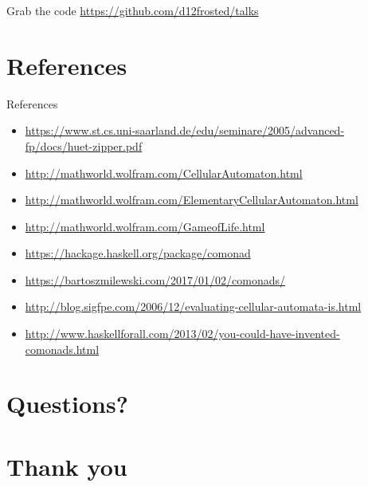 \documentclass[presentation,aspectratio=169,smaller]{beamer}
\begin{document}
\begin{frame}[label={sec:org5e860fe}]{Grab the code}
\url{https://github.com/d12frosted/talks}
\end{frame}

\section*{References}
\label{sec:orged78944}
\begin{frame}[label={sec:orgca59229}]{References}
\begin{itemize}
\item \url{https://www.st.cs.uni-saarland.de/edu/seminare/2005/advanced-fp/docs/huet-zipper.pdf}
\item \url{http://mathworld.wolfram.com/CellularAutomaton.html}
\item \url{http://mathworld.wolfram.com/ElementaryCellularAutomaton.html}
\item \url{http://mathworld.wolfram.com/GameofLife.html}
\item \url{https://hackage.haskell.org/package/comonad}
\item \url{https://bartoszmilewski.com/2017/01/02/comonads/}
\item \url{http://blog.sigfpe.com/2006/12/evaluating-cellular-automata-is.html}
\item \url{http://www.haskellforall.com/2013/02/you-could-have-invented-comonads.html}
\end{itemize}
\end{frame}

\section{Questions?}
\label{sec:org963d632}
\section{Thank you}
\label{sec:org0ecad66}
\end{document}
